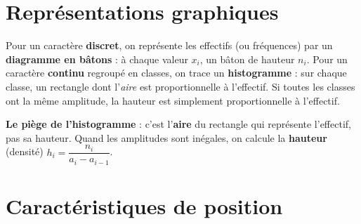 \section{Représentations graphiques}

\begin{definition}
Pour un caractère \textbf{discret}, on représente les effectifs (ou fréquences)
par un \textbf{diagramme en bâtons} : à chaque valeur $x_i$, un bâton de hauteur
$n_i$. Pour un caractère \textbf{continu} regroupé en classes, on trace un
\textbf{histogramme} : sur chaque classe, un rectangle dont l'\emph{aire} est
proportionnelle à l'effectif. Si toutes les classes ont la même amplitude, la
hauteur est simplement proportionnelle à l'effectif.
\end{definition}

\begin{aretenir}
\textbf{Le piège de l'histogramme} : c'est l'\textbf{aire} du rectangle qui
représente l'effectif, pas sa hauteur. Quand les amplitudes sont inégales, on
calcule la \textbf{hauteur} (densité) $h_i=\dfrac{n_i}{a_i-a_{i-1}}$.
\end{aretenir}

\begin{illus}
\end{illus}

\section{Caractéristiques de position}

